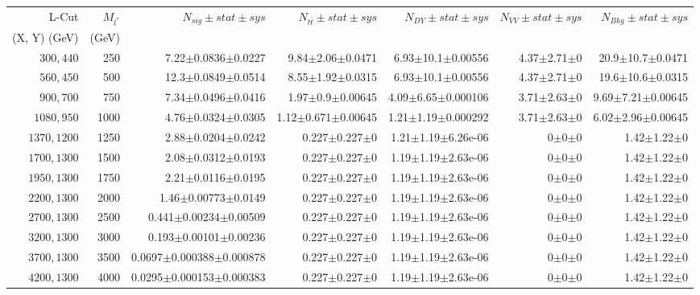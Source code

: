 \documentclass[]{article}
\begin{document}
\begin{table}
\begin{center}
\scriptsize{
\begin{tabular}{ |r|r|r|r|r|r|r|}
\hline 
L-Cut & $M_{l^*}$ & $N_{sig}\pm stat \pm sys $ &$N_{t\bar{t}}\pm stat \pm sys $ & $N_{DY}\pm stat \pm sys $ & $N_{VV}\pm stat \pm sys $ &$N_{Bkg}\pm stat \pm sys$\\
 (X, Y) (GeV) & (GeV) & && &&\\
\hline 
$300, 440$ & 250 & 7.22$\pm$0.0836$\pm$0.0227 & 9.84$\pm$2.06$\pm$0.0471 & 6.93$\pm$10.1$\pm$0.00556 & 4.37$\pm$2.71$\pm$0 & 20.9$\pm$10.7$\pm$0.0471 \\
$560, 450$ & 500 & 12.3$\pm$0.0849$\pm$0.0514 & 8.55$\pm$1.92$\pm$0.0315 & 6.93$\pm$10.1$\pm$0.00556 & 4.37$\pm$2.71$\pm$0 & 19.6$\pm$10.6$\pm$0.0315 \\
$900, 700$ & 750 & 7.34$\pm$0.0496$\pm$0.0416 & 1.97$\pm$0.9$\pm$0.00645 & 4.09$\pm$6.65$\pm$0.000106 & 3.71$\pm$2.63$\pm$0 & 9.69$\pm$7.21$\pm$0.00645 \\
$1080,950$ & 1000 & 4.76$\pm$0.0324$\pm$0.0305 & 1.12$\pm$0.671$\pm$0.00645 & 1.21$\pm$1.19$\pm$0.000292 & 3.71$\pm$2.63$\pm$0 & 6.02$\pm$2.96$\pm$0.00645 \\
$1370,1200$ & 1250 & 2.88$\pm$0.0204$\pm$0.0242 & 0.227$\pm$0.227$\pm$0 & 1.21$\pm$1.19$\pm$6.26e-06 & 0$\pm$0$\pm$0 & 1.42$\pm$1.22$\pm$0 \\
$1700,1300$ & 1500 & 2.08$\pm$0.0312$\pm$0.0193 & 0.227$\pm$0.227$\pm$0 & 1.19$\pm$1.19$\pm$2.63e-06 & 0$\pm$0$\pm$0 & 1.42$\pm$1.22$\pm$0 \\
$1950,1300$ & 1750 & 2.21$\pm$0.0116$\pm$0.0195 & 0.227$\pm$0.227$\pm$0 & 1.19$\pm$1.19$\pm$2.63e-06 & 0$\pm$0$\pm$0 & 1.42$\pm$1.22$\pm$0 \\
$2200,1300$ & 2000 & 1.46$\pm$0.00773$\pm$0.0149 & 0.227$\pm$0.227$\pm$0 & 1.19$\pm$1.19$\pm$2.63e-06 & 0$\pm$0$\pm$0 & 1.42$\pm$1.22$\pm$0 \\
$2700,1300$ & 2500 & 0.441$\pm$0.00234$\pm$0.00509 & 0.227$\pm$0.227$\pm$0 & 1.19$\pm$1.19$\pm$2.63e-06 & 0$\pm$0$\pm$0 & 1.42$\pm$1.22$\pm$0 \\
$3200,1300$ & 3000 & 0.193$\pm$0.00101$\pm$0.00236 & 0.227$\pm$0.227$\pm$0 & 1.19$\pm$1.19$\pm$2.63e-06 & 0$\pm$0$\pm$0 & 1.42$\pm$1.22$\pm$0 \\
$3700,1300$ & 3500 & 0.0697$\pm$0.000388$\pm$0.000878 & 0.227$\pm$0.227$\pm$0 & 1.19$\pm$1.19$\pm$2.63e-06 & 0$\pm$0$\pm$0 & 1.42$\pm$1.22$\pm$0 \\
$4200,1300$ & 4000 & 0.0295$\pm$0.000153$\pm$0.000383 & 0.227$\pm$0.227$\pm$0 & 1.19$\pm$1.19$\pm$2.63e-06 & 0$\pm$0$\pm$0 & 1.42$\pm$1.22$\pm$0 \\

\end{tabular}}
\end{center}
\end{table}
\end{document}

